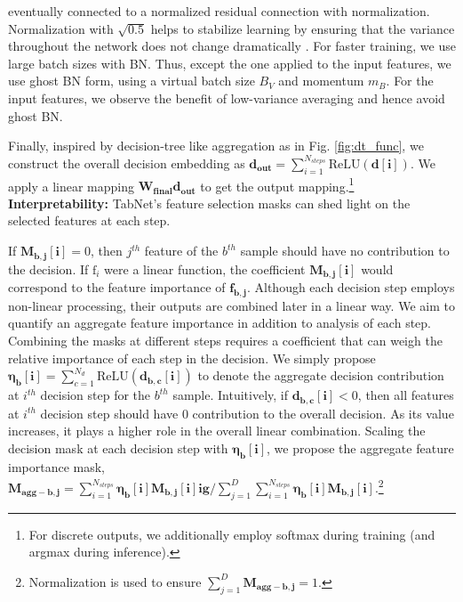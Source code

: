 eventually connected to a normalized residual connection with normalization. Normalization with $\sqrt{0.5}$ helps to stabilize learning by ensuring that the variance throughout the network does not change dramatically \citep{convseq2seq}. For faster training, we use large batch sizes with BN. Thus, except the one applied to the input features, we use ghost BN \citep{ghost_batch_norm} form, using a virtual batch size $B_V$ and momentum $m_B$. For the input features, we observe the benefit of low-variance averaging and hence avoid ghost BN. 

Finally, inspired by decision-tree like aggregation as in Fig. \ref{fig:dt_func}, we construct the overall decision embedding as $\mathbf{d_{out}} = \sum\nolimits_{i=1}^{N_{steps}} \text{ReLU}(\mathbf{d[i]})$.
We apply a linear mapping $\mathbf{W_{final}} \mathbf{d_{out}}$ to get the output mapping.\footnote{For discrete outputs, we additionally employ softmax during training (and argmax during inference).}
{\textbf{Interpretability:}}
TabNet's feature selection masks can shed light on the selected features at each step. 

If $\mathbf{M_{b,j}[i]} = 0$, then $j^{th}$ feature of the $b^{th}$ sample should have no contribution to the decision. If $\text{f}_i$ were a linear function, the coefficient $\mathbf{M_{b,j}[i]}$ would correspond to the feature importance of $\mathbf{f_{b,j}}$. 
Although each decision step employs non-linear processing, their outputs are combined later in a linear way. We aim to quantify an aggregate feature importance in addition to analysis of each step. Combining the masks at different steps requires a coefficient that can weigh the relative importance of each step in the decision. We simply propose $\mathbf{\eta_b[i]} =\sum_{c=1}^{N_d} \text{ReLU}(\mathbf{d_{b,c}[i]})$ to denote the aggregate decision contribution at $i^{th}$ decision step for the $b^{th}$ sample. Intuitively, if $\mathbf{d_{b,c}[i]} < 0$, then all features at $i^{th}$ decision step should have 0 contribution to the overall decision. As its value increases, it plays a higher role in the overall linear combination. Scaling the decision mask at each decision step with $\mathbf{\eta_b[i]}$, we propose the aggregate feature importance mask,
$\mathbf{M_{agg-b,j}} \! = \! \sum\nolimits_{i=1}^{N_{steps}}\! \mathbf{\eta_{b}[i]} \mathbf{M_{b,j}[i]} \mathbf{ig}/ \sum\nolimits_{j=1}^{D} \! \sum\nolimits_{i=1}^{N_{steps}} \! \mathbf{\eta_{b}[i]} \mathbf{M_{b,j}[i]}.$\footnote{Normalization is used to ensure $\sum\nolimits_{j=1}^{D} \mathbf{M_{agg-b,j}}=1$.}

